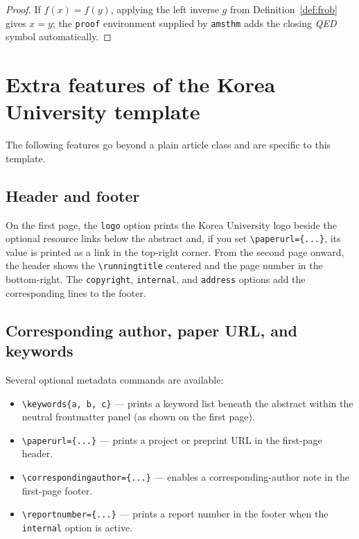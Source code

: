 \begin{proof}
If $f(x)=f(y)$, applying the left inverse $g$ from Definition~\ref{def:frob} gives $x=y$; the \verb+proof+ environment supplied by \verb+amsthm+ adds the closing
\emph{QED} symbol automatically.
\end{proof}




\section{Extra features of the Korea University template}
\label{sec:extras}

The following features go beyond a plain article class and are specific to this
template.

\subsection{Header and footer}
\label{sec:headerfooter}

On the first page, the \verb+logo+ option prints the Korea University logo beside the optional resource links below the abstract and, if you set \verb+\paperurl={...}+, its value is printed as a link in
the top-right corner. From the second page onward, the header shows the
\verb+\runningtitle+ centered and the page number in the bottom-right. The
\verb+copyright+, \verb+internal+, and \verb+address+ options add the
corresponding lines to the footer.

\subsection{Corresponding author, paper URL, and keywords}
\label{sec:metadata}

Several optional metadata commands are available:
\begin{itemize}
  \item \verb+\keywords{a, b, c}+ --- prints a keyword list beneath the abstract
    within the neutral frontmatter panel (as shown on the first page).
  \item \verb+\paperurl={...}+ --- prints a project or preprint URL in the
    first-page header.
  \item \verb+\correspondingauthor={...}+ --- enables a corresponding-author note
    in the first-page footer.
  \item \verb+\reportnumber={...}+ --- prints a report number in the footer when
    the \verb+internal+ option is active.
\end{itemize}

